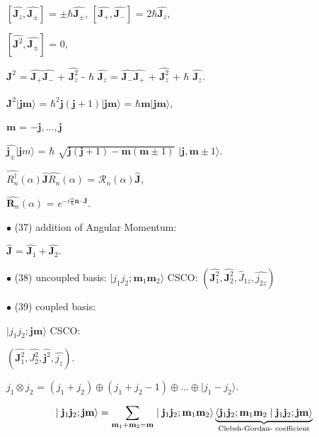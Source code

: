 \documentclass[a4paper, 10pt, onepage]{elegantbook}
\begin{document}
{$[\hat{\mathbf J_z}, \hat{\mathbf J_ \pm}]$ = $ \pm \hbar \hat{\mathbf J_ \pm}$, $[\hat{\mathbf J_+}, \hat{\mathbf 
J_-}]$ = $2 \hbar \hat{\mathbf J_z}$,  

$[\hat{\mathbf J^2}, \hat{\mathbf J_\pm}]$ = 0,  

$\hat{\mathbf J^2}$ = $\hat{\mathbf J_+} \hat{\mathbf J_-}$ + $\hat{\mathbf J^2_z}$ - $\hbar$ $\hat{\mathbf J_z}$ = 
$\hat{\mathbf J_-} \hat{\mathbf J_+}$ + $\hat{\mathbf J^2_z}$ + $\hbar$ $\hat{\mathbf J_z}$.  

$\hat{\mathbf J^2} |{\mathbf {jm}} \rangle$ = $\hbar^2 \mathbf j(\mathbf j + 1) | \mathbf {jm} \rangle$ = $ \hbar 
\mathbf m | \mathbf {jm} \rangle$,  

$\mathbf m$ = $ - \mathbf j,...,\mathbf j$  

$\hat{\mathbf j_\pm} | {\mathbf jm} \rangle$ = $\hbar$ $\sqrt{{{\mathbf j} {(\mathbf j + 1)}} - {\mathbf m}{(\mathbf m 
\pm 1)}}$ $ | \mathbf j, \mathbf m \pm 1 \rangle$. 

$\hat{R^\dagger_n}(\alpha) \hat{\mathbf J} \hat{R_n}(\alpha)$ = $\mathcal R_n (\alpha) \hat{\mathbf J}$,  

$\hat{\mathbf R_n}(\alpha)$ = $e^{ - i \frac{\alpha}{\hbar} {\mathbf n} \cdot {\mathbf J}}$. 

$\bullet$ (37) addition of Angular Momentum:  

$\hat{\mathbf J}$ = $\hat{\mathbf J_1} + \hat{\mathbf J_2}$.  

$\bullet$ (38) uncoupled basis: $ | j_1 j_2; \mathbf m_1 \mathbf m_2 \rangle$ $\text{CSCO:}$ $(\hat{\mathbf J^2_1}, 
\hat{\mathbf J^2_2},
\hat J_{1z}, \hat{j_{2z}})$  

$\bullet$ (39) coupled basis:  

$\mid {j_1} {j_2 ;} \mathbf{jm} \rangle$ CSCO: 

$(\hat{\mathbf J^2_1}, \hat{J^2_2}, \hat{\mathbf j^2}, \hat{j_z})$.  

$j_1 \otimes j_2$ = $(j_1 + j_2) \oplus  (j_1 + j_2 - 1)\oplus...\oplus \mid j_1 - j_2 \rangle$.  

\begin{equation}
\mid  \mathbf j_1 \mathbf j_2; \mathbf{jm} \rangle = \sum_{\mathbf m_1 + \mathbf m_2 = \mathbf m} \mid {\mathbf 
j_1}{\mathbf j_2}; {\mathbf m_1}{\mathbf m_2} \rangle \underbrace{\langle{\mathbf j_1 \mathbf j_2}; {\mathbf m_1 
\mathbf m_2} \mid {\mathbf j_1 \mathbf j_2}; \mathbf{jm} \rangle}_{\text{Clebsh-Gordan- 
coefficient\index{Clebsch-Gordan-coefficient}}}
\end{equation}

}
\end{document}
